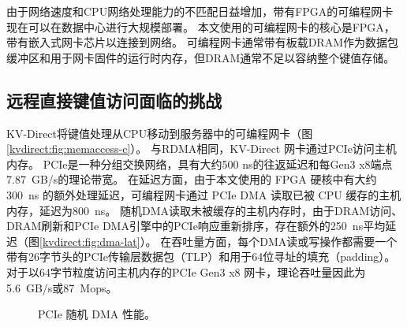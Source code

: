 由于网络速度和CPU网络处理能力的不匹配日益增加，带有FPGA的可编程网卡 \cite {vfp,greenberg2015sdn,li2016clicknp,caulfield2016cloud} 现在可以在数据中心进行大规模部署。
本文使用的可编程网卡的核心是FPGA，带有嵌入式网卡芯片以连接到网络。
可编程网卡通常带有板载DRAM作为数据包缓冲区和用于网卡固件的运行时内存\cite {li2016clicknp}，但DRAM通常不足以容纳整个键值存储。
\fi

\subsection{远程直接键值访问面临的挑战}
\label{kvdirect:sec:challenge}

KV-Direct将键值处理从CPU移动到服务器中的可编程网卡（图\ref {kvdirect:fig:memaccess-c}）。
与RDMA相同，KV-Direct 网卡通过PCIe访问主机内存。 PCIe是一种分组交换网络，具有大约500 ns的往返延迟和每Gen3 x8端点7.87~GB/s的理论带宽。
在延迟方面，由于本文使用的 FPGA 硬核中有大约 300~ns 的额外处理延迟，可编程网卡通过 PCIe DMA 读取已被 CPU 缓存的主机内存，延迟为800~ns。
随机DMA读取未被缓存的主机内存时，由于DRAM访问、DRAM刷新和PCIe DMA引擎中的PCIe响应重新排序，存在额外的250~ns平均延迟（图\ref {kvdirect:fig:dma-lat}）。
在吞吐量方面，每个DMA读或写操作都需要一个带有26字节头的PCIe传输层数据包（TLP）和用于64位寻址的填充（padding）。
对于以64字节粒度访问主机内存的PCIe Gen3 x8 网卡，理论吞吐量因此为5.6~GB/s或87~Mops。

\begin{figure}[t]
	\centering
	\caption{PCIe 随机 DMA 性能。}
	\label{kvdirect:fig:dma-perf}
\end{figure}

